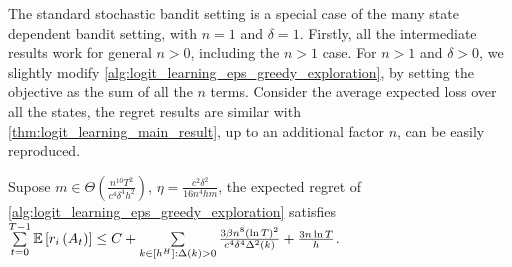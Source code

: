 The standard stochastic bandit setting is a special case of the many state dependent bandit setting, with $n = 1$ and $\delta = 1$. Firstly, all the intermediate results work for general $n > 0$, including the $n > 1$ case.
For $n > 1$ and $\delta > 0$, we slightly modify \cref{alg:logit_learning_eps_greedy_exploration}, by setting the objective as the sum of all the $n$ terms. Consider the average expected loss over all the states, the regret results are similar with \cref{thm:logit_learning_main_result}, up to an additional factor $n$, can be easily reproduced.
\begin{thm}
\label{thm:many_state_dependent_bandit_setting}
     Supose $m \in \Theta\left( \frac{n^{10} T^2}{c^4 \delta^4 h^2} \right)$, $\eta = \frac{c^2 \delta^2}{16 n^4 h m}$, the expected regret of \cref{alg:logit_learning_eps_greedy_exploration} satisfies $\sum\limits_{t=0}^{T-1}{ {\mathbb{E}} \left[ r_i\left(A_t\right) \right] } \le C + \sum\limits_{k \in [h^H] : \Delta(k) > 0}{ \frac{ 3 \beta n^8 \left( \ln{T} \right)^2}{c^4 \delta^4 \Delta^2(k)} }  + \frac{ 3 n \ln{T}}{h}$.
\end{thm}


